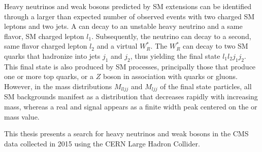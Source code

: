 Heavy neutrinos \nul and weak bosons \WR predicted by SM extensions can be identified through a larger 
than expected number of observed events with two charged SM leptons and two jets.  A \WR can 
decay to an unstable heavy neutrino \nul and a same flavor, SM charged lepton $l_{1}$.  Subsequently, the 
neutrino \nul can decay to a second, same flavor charged lepton $l_{2}$ and a virtual $W^{*}_{R}$.  The $W^{*}_{R}$ can 
decay to two SM quarks that hadronize into jets $j_{1}$ and $j_{2}$, thus yielding the final state $l_{1}l_{2}j_{1}j_{2}$.  
This final state is also produced by SM processes, principally those that produce one or more top quarks, or 
a $Z$ boson in association with quarks or gluons.  However, in the mass distributions $M_{lljj}$ and $M_{ljj}$ 
of the final state particles, all SM backgrounds manifest as a distribution that decreases rapidly with increasing 
mass, whereas a real \WR and \nul signal appears as a finite width peak centered on the \WR or \nul mass value.

This thesis presents a search for heavy neutrinos \nul and weak bosons \WR in the CMS data collected 
in 2015 using the CERN Large Hadron Collider.

